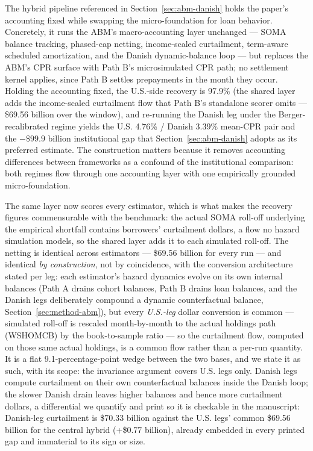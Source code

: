 \documentclass[12pt]{article}
\begin{document}
The hybrid pipeline referenced in Section~\ref{sec:abm-danish} holds the paper's accounting fixed while swapping the micro-foundation for loan behavior. Concretely, it runs the ABM's macro-accounting layer unchanged --- SOMA balance tracking, phased-cap netting, income-scaled curtailment, term-aware scheduled amortization, and the Danish dynamic-balance loop --- but replaces the ABM's CPR surface with Path B's microsimulated CPR path; no settlement kernel applies, since Path B settles prepayments in the month they occur. Holding the accounting fixed, the U.S.-side recovery is 97.9\% (the shared layer adds the income-scaled curtailment flow that Path B's standalone scorer omits --- \$69.56 billion over the window), and re-running the Danish leg under the Berger-recalibrated regime yields the U.S. 4.76\% / Danish 3.39\% mean-CPR pair and the $-\$99.9$ billion institutional gap that Section~\ref{sec:abm-danish} adopts as its preferred estimate. The construction matters because it removes accounting differences between frameworks as a confound of the institutional comparison: both regimes flow through one accounting layer with one empirically grounded micro-foundation.

The same layer now scores every estimator, which is what makes the recovery figures commensurable with the benchmark: the actual SOMA roll-off underlying the empirical shortfall contains borrowers' curtailment dollars, a flow no hazard simulation models, so the shared layer adds it to each simulated roll-off. The netting is identical across estimators --- \$69.56 billion for every run --- and identical \emph{by construction}, not by coincidence, with the conversion architecture stated per leg: each estimator's hazard dynamics evolve on its own internal balances (Path A drains cohort balances, Path B drains loan balances, and the Danish legs deliberately compound a dynamic counterfactual balance, Section~\ref{sec:method-abm}), but every \emph{U.S.-leg} dollar conversion is common --- simulated roll-off is rescaled month-by-month to the actual holdings path (WSHOMCB) by the book-to-sample ratio --- so the curtailment flow, computed on those same actual holdings, is a common flow rather than a per-run quantity. It is a flat 9.1-percentage-point wedge between the two bases, and we state it as such, with its scope: the invariance argument covers U.S. legs only. Danish legs compute curtailment on their own counterfactual balances inside the Danish loop; the slower Danish drain leaves higher balances and hence more curtailment dollars, a differential we quantify and print so it is checkable in the manuscript: Danish-leg curtailment is \$70.33 billion against the U.S. legs' common \$69.56 billion for the central hybrid (+\$0.77 billion), already embedded in every printed gap and immaterial to its sign or size.
\end{document}
